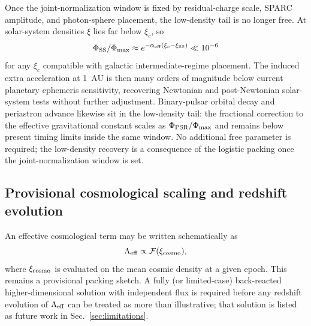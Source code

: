 \documentclass[11pt,a4paper]{article}
\begin{document}
Once the joint-normalization window is fixed by residual-charge scale, SPARC amplitude, and photon-sphere placement, the low-density tail is no longer free. At solar-system densities \(\xi\) lies far below \(\xi_c\), so
\begin{equation}
\Phi_{\rm SS}/\Phi_{\rm max}\approx e^{-\alpha_{\rm eff}(\xi_c-\xi_{\rm SS})}\ll 10^{-6}
\label{eq:Phi-SS}
\end{equation}
for any \(\xi_c\) compatible with galactic intermediate-regime placement. The induced extra acceleration at 1~AU is then many orders of magnitude below current planetary ephemeris sensitivity, recovering Newtonian and post-Newtonian solar-system tests without further adjustment. Binary-pulsar orbital decay and periastron advance likewise sit in the low-density tail: the fractional correction to the effective gravitational constant scales as \(\Phi_{\rm PSR}/\Phi_{\rm max}\) and remains below present timing limits inside the same window. No additional free parameter is required; the low-density recovery is a consequence of the logistic packing once the joint-normalization window is set.

\subsection{Provisional cosmological scaling and redshift evolution}
\label{sec:cosmo}

An effective cosmological term may be written schematically as
\begin{equation}
\Lambda_{\rm eff}\propto\mathcal{F}(\xi_{\rm cosmo}),
\label{eq:Lambda-eff}
\end{equation}
where \(\xi_{\rm cosmo}\) is evaluated on the mean cosmic density at a given epoch. This remains a provisional packing sketch. A fully (or limited-case) back-reacted higher-dimensional solution with independent flux is required before any redshift evolution of \(\Lambda_{\rm eff}\) can be treated as more than illustrative; that solution is listed as future work in Sec.~\ref{sec:limitations}.
\end{document}

